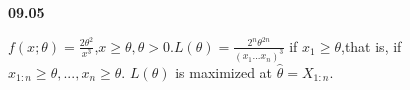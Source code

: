 
{\bf 09.05}

$f(x;\theta)=\frac{2\theta^2}{x^3}$,$x\geq\theta,\theta>0. L(\theta)=\frac{2^n\theta^{2n}}{(x_1...x_n)^3}$ if $x_1\geq\theta$,that is, if $x_{1:n}\geq\theta,
...,x_n\geq\theta$. $L(\theta)$ is maximized at $\hat{\theta}=X_{1:n}$. \\

